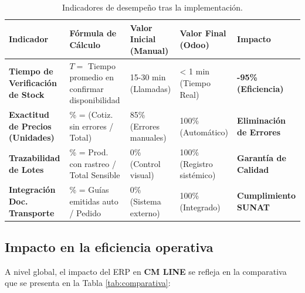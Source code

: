 \begin{table}[H]
    \centering
    \footnotesize
    \begin{tabular}{|p{3cm}|p{3cm}|p{2.5cm}|p{2.5cm}|p{3cm}|}
        \hline
        \textbf{Indicador} & \textbf{Fórmula de Cálculo} & \textbf{Valor Inicial (Manual)} & \textbf{Valor Final (Odoo)} & \textbf{Impacto} \\ \hline
        \textbf{Tiempo de Verificación de Stock} & $T = $ Tiempo promedio en confirmar disponibilidad & 15-30 min (Llamadas) & < 1 min (Tiempo Real) & \textbf{-95\% (Eficiencia)} \\ \hline
        \textbf{Exactitud de Precios (Unidades)} & \% = (Cotiz. sin errores / Total) & 85\% (Errores manuales) & 100\% (Automático) & \textbf{Eliminación de Errores} \\ \hline
        \textbf{Trazabilidad de Lotes} & \% = Prod. con rastreo / Total Sensible & 0\% (Control visual) & 100\% (Registro sistémico) & \textbf{Garantía de Calidad} \\ \hline
        \textbf{Integración Doc. Transporte} & \% = Guías emitidas auto / Pedido & 0\% (Sistema externo) & 100\% (Integrado) & \textbf{Cumplimiento SUNAT} \\ \hline
    \end{tabular}
    \caption{Indicadores de desempeño tras la implementación.}
    \label{tab:kpis}
\end{table}

\subsection{Impacto en la eficiencia operativa}
A nivel global, el impacto del ERP en \textbf{CM LINE} se refleja en la comparativa que se presenta en la Tabla \ref{tab:comparativa}:

